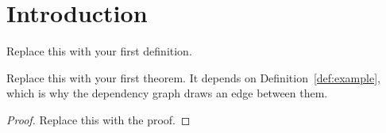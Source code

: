 %
%

\chapter{Introduction}

\begin{definition}
  \label{def:example}
  Replace this with your first definition.
\end{definition}

\begin{theorem}
  \label{thm:example}
  \leanok
  Replace this with your first theorem. It depends on
  Definition~\ref{def:example}, which is why the dependency graph draws an edge
  between them.
\end{theorem}
\begin{proof}
  Replace this with the proof.
\end{proof}
